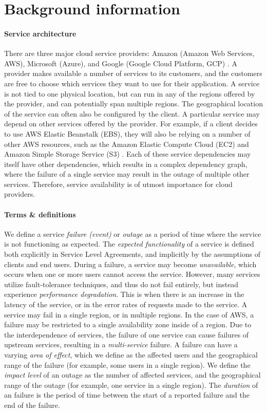 \section{Background information}
\paragraph{Service architecture}
There are three major cloud service providers: Amazon (Amazon Web Services, AWS), Microsoft (Azure), and Google (Google Cloud Platform, GCP) \cite{dignan2020, jones2020}.
A provider makes available a number of services to its customers, and the customers are free to choose which services they want to use for their application.
A service is not tied to one physical location, but can run in any of the regions offered by the provider, and can potentially span multiple regions.
The geographical location of the service can often also be configured by the client.
A particular service may depend on other services offered by the provider.
For example, if a client decides to use AWS Elastic Beanstalk (EBS), they will also be relying on a number of other AWS resources, such as the Amazon Elastic Compute Cloud (EC2) and Amazon Simple Storage Service (S3) \cite{awsFaq}.
Each of these service dependencies may itself have other dependencies, which results in a complex dependency graph, where the failure of a single service may result in the outage of multiple other services.
Therefore, service availability is of utmost importance for cloud providers.

\paragraph{Terms \& definitions}
We define a service \textit{failure (event)} or \textit{outage} as a period of time where the service is not functioning as expected.
The \textit{expected functionality} of a service is defined both explicitly in Service Level Agreements, and implicitly by the assumptions of clients and end users.
During a failure, a service may become \textit{unavailable}, which occurs when one or more users cannot access the service.
However, many services utilize fault-tolerance techniques, and thus do not fail entirely, but instead experience \textit{performance degradation}.
This is when there is an increase in the latency of the service, or in the error rates of requests made to the service.
A service may fail in a single region, or in multiple regions.
In the case of AWS, a failure may be restricted to a single availability zone inside of a region.
Due to the interdependence of services, the failure of one service can cause failures of upstream services, resulting in a \textit{multi-service} failure.
A failure can have a varying \textit{area of effect}, which we define as the affected users and the geographical range of the failure (for example, some users in a single region).
We define the \textit{impact level} of an outage as the number of affected services, and the geographical range of the outage (for example, one service in a single region).
The \textit{duration} of an failure is the period of time between the start of a reported failure and the end of the failure.
